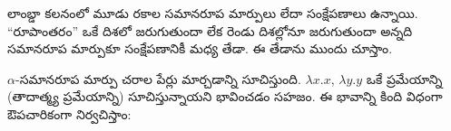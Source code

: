 \documentclass[../../../include/open-logic-section]{subfiles}
\begin{document}

లాంబ్డా కలనంలో మూడు రకాల సమానరూప మార్పులు లేదా సంక్షేపణాలు ఉన్నాయి. ``రూపాంతరం'' ఒకే దిశలో జరుగుతుందా లేక రెండు దిశల్లోనూ జరుగుతుందా అన్నది సమానరూప మార్పుకూ సంక్షేపణానికీ మధ్య తేడా. ఈ తేడాను ముందు చూస్తాం.

$\alpha$-సమానరూప మార్పు చరాల పేర్లు మార్చడాన్ని సూచిస్తుంది. $\lambda x. x$, $\lambda y.y$ ఒకే ప్రమేయాన్ని (తాదాత్మ్య ప్రమేయాన్ని) సూచిస్తున్నాయని భావించడం సహజం. ఈ భావాన్ని కింది విధంగా ఔపచారికంగా నిర్వచిస్తాం:
\end{document}
